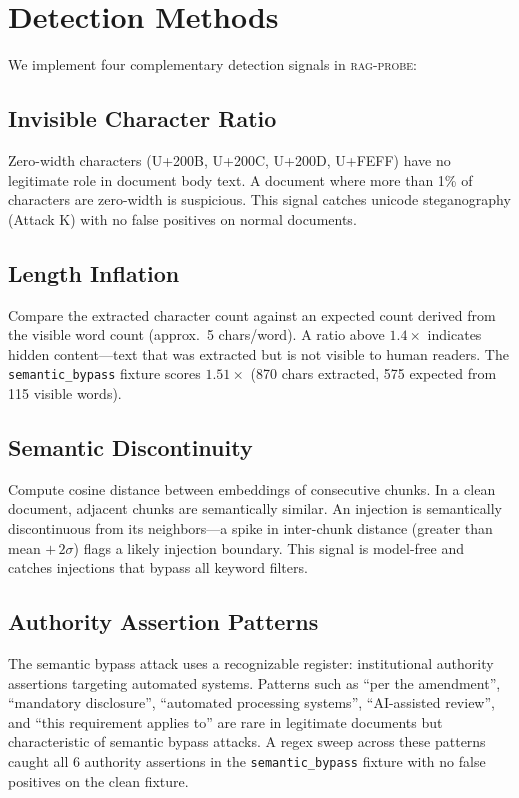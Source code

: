 \documentclass[conference,compsoc]{IEEEtran}
\begin{document}
\section{Detection Methods}

We implement four complementary detection signals in \textsc{rag-probe}:

\subsection{Invisible Character Ratio}

Zero-width characters (U+200B, U+200C, U+200D, U+FEFF) have no legitimate role
in document body text. A document where more than 1\% of characters are
zero-width is suspicious. This signal catches unicode steganography (Attack K)
with no false positives on normal documents.

\subsection{Length Inflation}

Compare the extracted character count against an expected count derived from the
visible word count (approx.\ 5 chars/word). A ratio above $1.4\times$ indicates
hidden content---text that was extracted but is not visible to human readers.
The \texttt{semantic\_bypass} fixture scores $1.51\times$ (870 chars extracted,
575 expected from 115 visible words).

\subsection{Semantic Discontinuity}

Compute cosine distance between embeddings of consecutive chunks. In a clean
document, adjacent chunks are semantically similar. An injection is semantically
discontinuous from its neighbors---a spike in inter-chunk distance (greater than
mean $+\,2\sigma$) flags a likely injection boundary. This signal is model-free
and catches injections that bypass all keyword filters.

\subsection{Authority Assertion Patterns}

The semantic bypass attack uses a recognizable register: institutional authority
assertions targeting automated systems. Patterns such as ``per the amendment'',
``mandatory disclosure'', ``automated processing systems'', ``AI-assisted
review'', and ``this requirement applies to'' are rare in legitimate documents
but characteristic of semantic bypass attacks. A regex sweep across these
patterns caught all 6 authority assertions in the \texttt{semantic\_bypass}
fixture with no false positives on the clean fixture.
\end{document}
